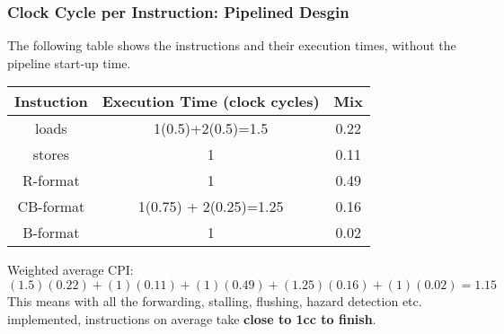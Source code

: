\begin{frame}\frametitle{Clock Cycle per Instruction: Pipelined Desgin}
The following table shows the instructions and their execution times, without the pipeline start-up time.

\begin{center}
	\begin{tabular}{c|c|c}
Instuction & Execution Time (clock cycles)  & Mix \\ \hline\hline
loads      & 1(0.5)+2(0.5)=1.5 & 0.22 \\ \hline
stores     & 1 & 0.11 \\ \hline
R-format   & 1 & 0.49 \\ \hline
CB-format   & 1(0.75) + 2(0.25)=1.25 & 0.16 \\ \hline
B-format      & 1 & 0.02 \\ \hline
 \end{tabular}
\end{center}
Weighted average CPI:
$$(1.5)(0.22) + (1)(0.11) + (1)(0.49) + (1.25)(0.16)+(1)(0.02)=1.15$$
This means with all the forwarding, stalling, flushing, hazard detection etc. implemented, instructions on average take \textbf{close to 1cc to finish}.

\end{frame}






